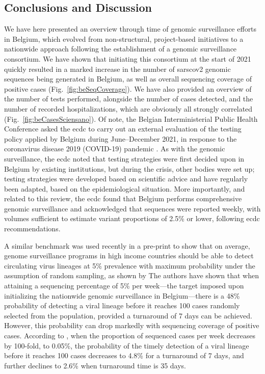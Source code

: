 \subsection{Conclusions and Discussion}
We have here presented an overview through time of genomic surveillance efforts in Belgium, which evolved from non-structural, project-based initiatives to a nationwide approach following the establishment of a genomic surveillance consortium.
We have shown that initiating this consortium at the start of 2021 quickly resulted in a marked increase in the number of \gls{sarscov2} genomic sequences being generated in Belgium, as well as overall sequencing coverage of positive cases (Fig.~\ref{fig:beSeqCoverage}).
We have also provided an overview of the number of tests performed, alongside the number of cases detected, and the number of recorded hospitalizations, which are obviously all strongly correlated (Fig.~\ref{fig:beCasesSciensano}).
Of note, the Belgian Interministerial Public Health Conference asked the \gls{ecdc} to carry out an external evaluation of the testing policy applied by Belgium during June--December 2021, in response to the coronavirus disease 2019 (COVID-19) pandemic \citep{ecdcBelgiumTesting}.
As with the genomic surveillance, the \gls{ecdc} noted that testing strategies were first decided upon in Belgium by existing institutions, but during the crisis, other bodies were set up; testing strategies were developed based on scientific advice and have regularly been adapted, based on the epidemiological situation.
More importantly, and related to this review, the \gls{ecdc} found that Belgium performs comprehensive genomic surveillance and acknowledged that sequences were reported weekly, with volumes sufficient to estimate variant proportions of 2.5\% or lower, following \gls{ecdc} recommendations.

A similar benchmark was used recently in a pre-print to show that on average, genome surveillance programs in high income countries should be able to detect circulating virus lineages at 5\% prevalence with maximum probability under the assumption of random sampling, as shown by \citet{brito2022global} The authors have shown that when attaining a sequencing percentage of 5\% per week—the target imposed upon initializing the nationwide genomic surveillance in Belgium—there is a 48\% probability of detecting a viral lineage before it reaches 100 cases randomly selected from the population, provided a turnaround of 7 days can be achieved.
However, this probability can drop markedly with sequencing coverage of positive cases.
According to \citet{brito2022global}, when the proportion of sequenced cases per week decreases by 100-fold, to 0.05\%, the probability of the timely detection of a viral lineage before it reaches 100 cases decreases to 4.8\% for a turnaround of 7 days, and further declines to 2.6\% when turnaround time is 35 days.

